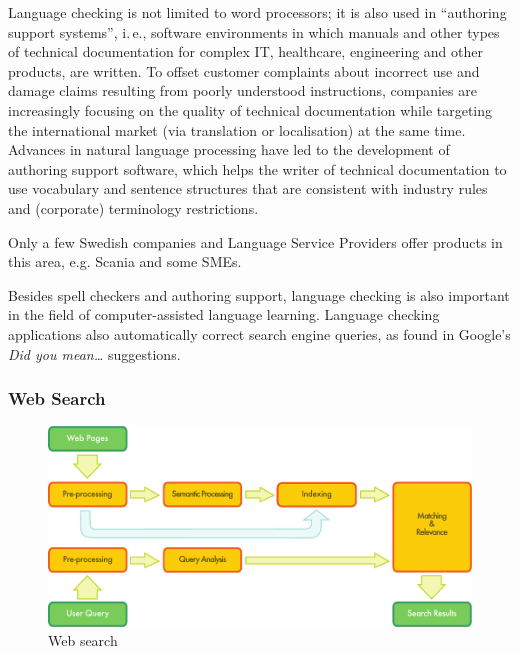 \begin{multicols}{2}

Language checking is not limited to word processors; it is also used in “authoring support systems”, i.\,e., software environments in which manuals and other types of technical documentation for complex IT, healthcare, engineering and other products, are written. To offset customer complaints about incorrect use and damage claims resulting from poorly understood instructions, companies are increasingly focusing on the quality of technical documentation while targeting the international market (via translation or localisation) at the same time. Advances in natural language processing have led to the development of authoring support software, which helps the writer of technical documentation to use vocabulary and sentence structures that are consistent with industry rules and (corporate) terminology restrictions.

Only a few Swedish companies and Language Service Providers offer products in this area, e.g. Scania and some SMEs.

Besides spell checkers and authoring support, language checking is also important in the field of computer-assisted language learning. Language checking applications also automatically correct search engine queries, as found in Google's \textit{Did you mean…} suggestions.

\subsubsection{Web Search}

\begin{figure}[htb]
  \center
  \includegraphics[width=\textwidth]{../_media/english/web_search_architecture}
  \caption{Web search}
  \label{fig:websearcharch_en}
 \end{figure}


\end{multicols}
